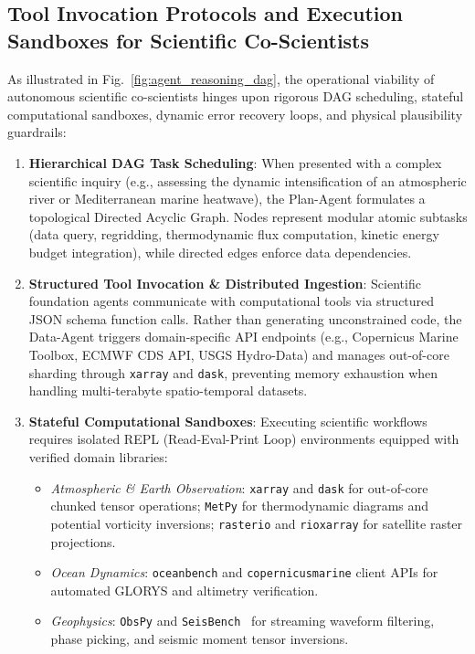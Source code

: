 \subsection{Tool Invocation Protocols and Execution Sandboxes for Scientific Co-Scientists}
\label{sec:agent_tool_interfaces}
As illustrated in Fig.~\ref{fig:agent_reasoning_dag}, the operational viability of autonomous scientific co-scientists hinges upon rigorous DAG scheduling, stateful computational sandboxes, dynamic error recovery loops, and physical plausibility guardrails:
\begin{enumerate}
    \item \textbf{Hierarchical DAG Task Scheduling}: When presented with a complex scientific inquiry (e.g., assessing the dynamic intensification of an atmospheric river or Mediterranean marine heatwave), the Plan-Agent formulates a topological Directed Acyclic Graph. Nodes represent modular atomic subtasks (data query, regridding, thermodynamic flux computation, kinetic energy budget integration), while directed edges enforce data dependencies.
    \item \textbf{Structured Tool Invocation \& Distributed Ingestion}: Scientific foundation agents communicate with computational tools via structured JSON schema function calls. Rather than generating unconstrained code, the Data-Agent triggers domain-specific API endpoints (e.g., Copernicus Marine Toolbox, ECMWF CDS API, USGS Hydro-Data) and manages out-of-core sharding through \texttt{xarray} and \texttt{dask}, preventing memory exhaustion when handling multi-terabyte spatio-temporal datasets.
    \item \textbf{Stateful Computational Sandboxes}: Executing scientific workflows requires isolated REPL (Read-Eval-Print Loop) environments equipped with verified domain libraries:
    \begin{itemize}
        \item \textit{Atmospheric \& Earth Observation}: \texttt{xarray} and \texttt{dask} for out-of-core chunked tensor operations; \texttt{MetPy} for thermodynamic diagrams and potential vorticity inversions; \texttt{rasterio} and \texttt{rioxarray} for satellite raster projections.
        \item \textit{Ocean Dynamics}: \texttt{oceanbench} and \texttt{copernicusmarine} client APIs for automated GLORYS and altimetry verification.
        \item \textit{Geophysics}: \texttt{ObsPy} and \texttt{SeisBench}~\cite{woollam2022seisbench} for streaming waveform filtering, phase picking, and seismic moment tensor inversions.

\end{itemize}
\end{enumerate}
